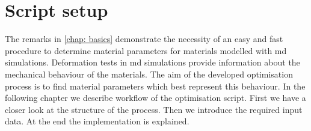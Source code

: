 




\chapter{Script setup} \label{chap: modelsAndMethods}

The remarks in \autoref{chap: basics} demonstrate the necessity of an easy and fast procedure to determine material parameters for materials modelled with \acrshort{md} simulations. Deformation tests in \acrshort{md} simulations provide information about the mechanical behaviour of the materials. The aim of the developed optimisation process is to find material parameters which best represent this behaviour.
In the following chapter we describe workflow of the optimisation script. First we have a closer look at the structure of the process. Then we introduce the required input data. At the end the implementation is explained. \\


